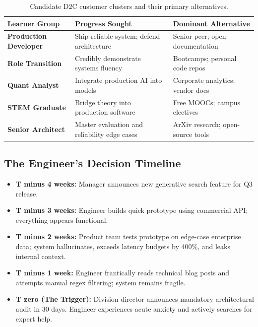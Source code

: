 \begin{table}[h]
\centering
\footnotesize
\begin{tabularx}{\columnwidth}{>{\RaggedRight\bfseries}p{2.0cm} >{\RaggedRight}X >{\RaggedRight}p{2.1cm}}
\toprule
Learner Group & Progress Sought & Dominant Alternative \\
\midrule
Production Developer & Ship reliable system; defend architecture & Senior peer; open documentation \\
\addlinespace
Role Transition & Credibly demonstrate systems fluency & Bootcamps; personal code repos \\
\addlinespace
Quant Analyst & Integrate production AI into models & Corporate analytics; vendor docs \\
\addlinespace
STEM Graduate & Bridge theory into production software & Free MOOCs; campus electives \\
\addlinespace
Senior Architect & Master evaluation and reliability edge cases & ArXiv research; open-source tools \\
\bottomrule
\end{tabularx}
\caption{Candidate D2C customer clusters and their primary alternatives.}
\label{tab:ch6_bayes_d2c_clusters}
\end{table}

\subsection{The Engineer's Decision Timeline}

\begin{itemize}[leftmargin=1.2em,itemsep=0.2ex]
  \item \textbf{T minus 4 weeks:} Manager announces new generative search feature for Q3 release.
  \item \textbf{T minus 3 weeks:} Engineer builds quick prototype using commercial API; everything appears functional.
  \item \textbf{T minus 2 weeks:} Product team tests prototype on edge-case enterprise data; system hallucinates, exceeds latency budgets by 400\%, and leaks internal context.
  \item \textbf{T minus 1 week:} Engineer frantically reads technical blog posts and attempts manual regex filtering; system remains fragile.
  \item \textbf{T zero (The Trigger):} Division director announces mandatory architectural audit in 30 days. Engineer experiences acute anxiety and actively searches for expert help.
\end{itemize}

